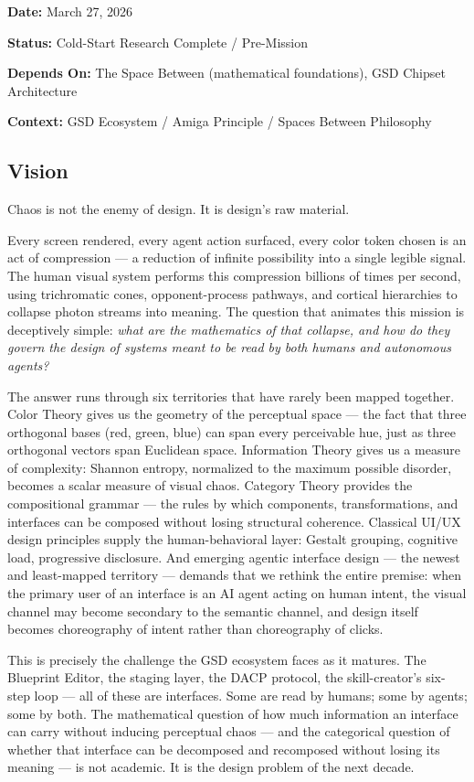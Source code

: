 \documentclass[11pt,letterpaper]{article}
\newcommand{\metafield}[2]{\textbf{\sffamily #1} #2\par}
\begin{document}
\metafield{Date:}{March 27, 2026}
\metafield{Status:}{Cold-Start Research Complete / Pre-Mission}
\metafield{Depends On:}{The Space Between (mathematical foundations), GSD Chipset Architecture}
\metafield{Context:}{GSD Ecosystem / Amiga Principle / Spaces Between Philosophy}

\subsection{Vision}

Chaos is not the enemy of design. It is design's raw material.

Every screen rendered, every agent action surfaced, every color token chosen is an act of compression --- a reduction of infinite possibility into a single legible signal. The human visual system performs this compression billions of times per second, using trichromatic cones, opponent-process pathways, and cortical hierarchies to collapse photon streams into meaning. The question that animates this mission is deceptively simple: \textit{what are the mathematics of that collapse, and how do they govern the design of systems meant to be read by both humans and autonomous agents?}

The answer runs through six territories that have rarely been mapped together. Color Theory gives us the geometry of the perceptual space --- the fact that three orthogonal bases (red, green, blue) can span every perceivable hue, just as three orthogonal vectors span Euclidean space. Information Theory gives us a measure of complexity: Shannon entropy, normalized to the maximum possible disorder, becomes a scalar measure of visual chaos. Category Theory provides the compositional grammar --- the rules by which components, transformations, and interfaces can be composed without losing structural coherence. Classical UI/UX design principles supply the human-behavioral layer: Gestalt grouping, cognitive load, progressive disclosure. And emerging agentic interface design --- the newest and least-mapped territory --- demands that we rethink the entire premise: when the primary user of an interface is an AI agent acting on human intent, the visual channel may become secondary to the semantic channel, and design itself becomes choreography of intent rather than choreography of clicks.

This is precisely the challenge the GSD ecosystem faces as it matures. The Blueprint Editor, the staging layer, the DACP protocol, the skill-creator's six-step loop --- all of these are interfaces. Some are read by humans; some by agents; some by both. The mathematical question of how much information an interface can carry without inducing perceptual chaos --- and the categorical question of whether that interface can be decomposed and recomposed without losing its meaning --- is not academic. It is the design problem of the next decade.
\end{document}
